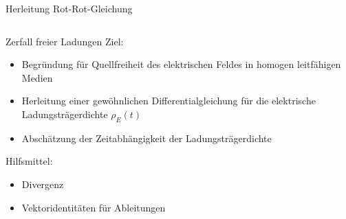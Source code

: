 \documentclass[fleqn,aspectratio=43]{beamer}
\begin{document}
\begin{frame}{Herleitung Rot-Rot-Gleichung}
\begin{columns}[c]
        \begin{column}{0.3\textwidth}
        \end{column}
    \end{columns}
\end{frame}

\begin{frame}{Zerfall freier Ladungen}
    Ziel:
    \begin{itemize}
        \item Begründung für Quellfreiheit des elektrischen Feldes in homogen leitfähigen Medien
        \item Herleitung einer gewöhnlichen Differentialgleichung für die elektrische Ladungsträgerdichte $\rho_E(t)$
        \item Abschätzung der Zeitabhängigkeit der Ladungsträger\-dichte
    \end{itemize}
    Hilfsmittel:
    \begin{itemize}
        \item Divergenz
        \item Vektoridentitäten für Ableitungen
    \end{itemize}

\end{frame}
\end{document}
